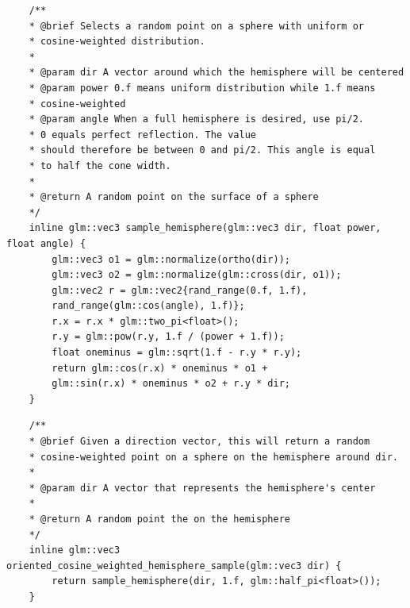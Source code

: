 \documentclass[
  twoside,
  11pt, a4paper,
  footinclude=true,
  headinclude=true,
  cleardoublepage=empty
]{scrreprt}
\begin{document}
\begin{verbatim}
    /**
    * @brief Selects a random point on a sphere with uniform or
    * cosine-weighted distribution.
    *
    * @param dir A vector around which the hemisphere will be centered
    * @param power 0.f means uniform distribution while 1.f means
    * cosine-weighted
    * @param angle When a full hemisphere is desired, use pi/2.
    * 0 equals perfect reflection. The value
    * should therefore be between 0 and pi/2. This angle is equal
    * to half the cone width.
    *
    * @return A random point on the surface of a sphere
    */
    inline glm::vec3 sample_hemisphere(glm::vec3 dir, float power, float angle) {
        glm::vec3 o1 = glm::normalize(ortho(dir));
        glm::vec3 o2 = glm::normalize(glm::cross(dir, o1));
        glm::vec2 r = glm::vec2{rand_range(0.f, 1.f),
        rand_range(glm::cos(angle), 1.f)};
        r.x = r.x * glm::two_pi<float>();
        r.y = glm::pow(r.y, 1.f / (power + 1.f));
        float oneminus = glm::sqrt(1.f - r.y * r.y);
        return glm::cos(r.x) * oneminus * o1 +
        glm::sin(r.x) * oneminus * o2 + r.y * dir;
    }
\end{verbatim}
\begingroup
{}
\endgroup

\begin{verbatim}
    /**
    * @brief Given a direction vector, this will return a random
    * cosine-weighted point on a sphere on the hemisphere around dir.
    *
    * @param dir A vector that represents the hemisphere's center
    *
    * @return A random point the on the hemisphere
    */
    inline glm::vec3 oriented_cosine_weighted_hemisphere_sample(glm::vec3 dir) {
        return sample_hemisphere(dir, 1.f, glm::half_pi<float>());
    }
\end{verbatim}
\begingroup
{}
\endgroup
\end{document}
